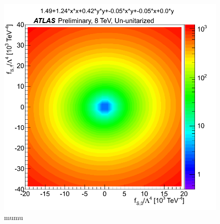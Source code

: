 \begin{figure}[tb]
\centering
\includegraphics[width=.7\textwidth]{figures/aqgc_fits/mumu/2l2jUnUnit_mumu.png}
\caption{mumu}
\label{fig:aqgc_fit_mumu_ununit}
\end{figure}

